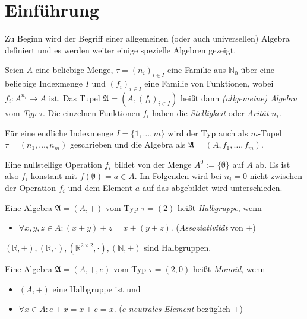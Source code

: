 \section{Einführung}

Zu Beginn wird der Begriff einer allgemeinen (oder auch universellen) Algebra definiert und es werden weiter einige spezielle Algebren gezeigt.

\begin{definition}\label{def:algebra}
    Seien $A$ eine beliebige Menge, $\tau = (n_i)_{i \in I}$ eine Familie aus $\mathbb{N}_0$ über eine beliebige Indexmenge $I$ und $(f_i)_{i \in I}$ eine Familie von Funktionen, wobei $f_i: A^{n_i} \to A$ ist. 
     Das Tupel $\mathfrak{A} = (A, (f_i)_{i \in I})$ heißt dann \emph{(allgemeine) Algebra} vom \emph{Typ} $\tau$. Die einzelnen Funktionen $f_i$ haben die \emph{Stelligkeit} oder \emph{Arität} $n_i$.
\end{definition}

\begin{remark}
    Für eine endliche Indexmenge $I = \{1, \ldots, m\}$ wird der Typ auch als $m$-Tupel $\tau = (n_1, \ldots, n_m)$ geschrieben und die Algebra als $\mathfrak{A} = (A, f_1, \ldots, f_m)$.
\end{remark}

\begin{remark}
    Eine nullstellige Operation $f_i$ bildet von der Menge $A^0 := \{\emptyset\}$ auf $A$ ab. Es ist also $f_i$ konstant mit $f(\emptyset) = a \in A$. Im Folgenden wird bei $n_i = 0$ nicht zwischen der Operation $f_i$ und dem Element $a$ auf das abgebildet wird unterschieden.
\end{remark}

\begin{definition}
    Eine Algebra $\mathfrak{A} = (A, +)$ vom Typ $\tau = (2)$ heißt \emph{Halbgruppe}, wenn 
    \begin{itemize}[topsep=0pt, label={--}]
        \item $\forall x,y,z \in A: (x + y) + z = x + (y + z)$. \tab (\emph{Assoziativität} von $+$)
    \end{itemize}
\end{definition}

\begin{example} $(\mathbb{R}, +), (\mathbb{R}, \cdot), (\mathbb{R}^{2\times 2}, \cdot), (\mathbb{N}, +)$ sind Halbgruppen.
\end{example}

\begin{definition}
    Eine Algebra $\mathfrak{A} = (A, +, e)$ vom Typ $\tau = (2,0)$ heißt \emph{Monoid}, wenn
    \begin{itemize}[topsep=0pt, label={--}]
        \item $(A, +)$ eine Halbgruppe ist und
        \item $\forall x \in A: e + x = x + e = x$. \tab ($e$ \emph{neutrales Element} bezüglich $+$)
    \end{itemize}
\end{definition}


